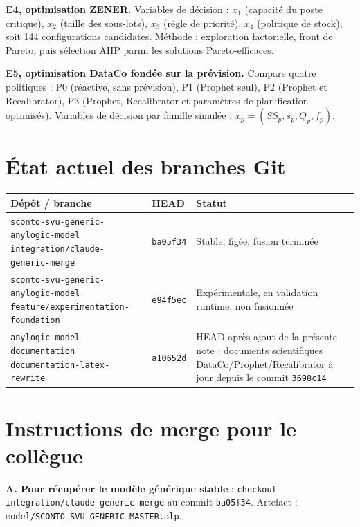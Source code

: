 \documentclass[11pt,a4paper]{article}
\newcommand{\code}[1]{\texttt{#1}}
\begin{document}
\textbf{E4, optimisation ZENER.} Variables de décision : $x_1$ (capacité
du poste critique), $x_2$ (taille des sous-lots), $x_3$ (règle de
priorité), $x_4$ (politique de stock), soit 144 configurations candidates.
Méthode : exploration factorielle, front de Pareto, puis sélection AHP
parmi les solutions Pareto-efficaces.

\textbf{E5, optimisation DataCo fondée sur la prévision.} Compare quatre
politiques : P0 (réactive, sans prévision), P1 (Prophet seul), P2 (Prophet
et Recalibrator), P3 (Prophet, Recalibrator et paramètres de planification
optimisés). Variables de décision par famille simulée :
$x_p = (SS_p, s_p, Q_p, f_p)$.

\section{État actuel des branches Git}

\begin{center}
\small
\begin{tabularx}{\textwidth}{p{4.6cm}p{4.2cm}X}
\toprule
Dépôt / branche & HEAD & Statut \\
\midrule
\code{sconto-svu-generic-\allowbreak anylogic-model} \newline \code{integration/\allowbreak claude-generic-merge} & \code{ba05f34} & Stable, figée, fusion terminée \\
\code{sconto-svu-generic-\allowbreak anylogic-model} \newline \code{feature/\allowbreak experimentation-foundation} & \code{e94f5ec} & Expérimentale, en validation runtime, non fusionnée \\
\code{anylogic-model-\allowbreak documentation} \newline \code{documentation-\allowbreak latex-rewrite} & \code{a10652d} & HEAD après ajout de la présente note ; documents scientifiques DataCo/Prophet/Recalibrator à jour depuis le commit \code{3698c14} \\
\bottomrule
\end{tabularx}
\end{center}

\section{Instructions de merge pour le collègue}
\label{sec:merge}

\textbf{A. Pour récupérer le modèle générique stable} : \code{checkout}
\code{integration/\allowbreak claude-\allowbreak generic-merge} au commit \code{ba05f34}.
Artefact : \code{model/\allowbreak SCONTO\_SVU\_\allowbreak GENERIC\_\allowbreak MASTER.alp}.
\end{document}
